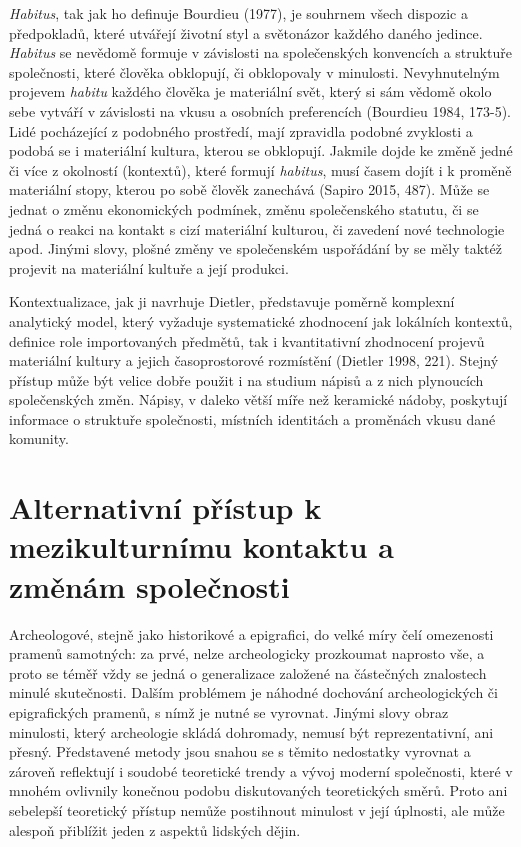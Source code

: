 {\em Habitus}, tak jak ho definuje Bourdieu (1977), je souhrnem všech dispozic a předpokladů, které utvářejí životní styl a světonázor každého daného jedince. {\em Habitus} se nevědomě formuje v závislosti na společenských konvencích a struktuře společnosti, které člověka obklopují, či obklopovaly v minulosti. Nevyhnutelným projevem {\em habitu} každého člověka je materiální svět, který si sám vědomě okolo sebe vytváří v závislosti na vkusu a osobních preferencích (Bourdieu 1984, 173-5). Lidé pocházející z podobného prostředí, mají zpravidla podobné zvyklosti a podobá se i materiální kultura, kterou se obklopují. Jakmile dojde ke změně jedné či více z okolností (kontextů), které formují {\em habitus}, musí časem dojít i k proměně materiální stopy, kterou po sobě člověk zanechává (Sapiro 2015, 487). Může se jednat o změnu ekonomických podmínek, změnu společenského statutu, či se jedná o reakci na kontakt s cizí materiální kulturou, či zavedení nové technologie apod. Jinými slovy, plošné změny ve společenském uspořádání by se měly taktéž projevit na materiální kultuře a její produkci.

Kontextualizace, jak ji navrhuje Dietler, představuje poměrně komplexní analytický model, který vyžaduje systematické zhodnocení jak lokálních kontextů, definice role importovaných předmětů, tak i kvantitativní zhodnocení projevů materiální kultury a jejich časoprostorové rozmístění (Dietler 1998, 221). Stejný přístup může být velice dobře použit i na studium nápisů a z nich plynoucích společenských změn. Nápisy, v daleko větší míře než keramické nádoby, poskytují informace o struktuře společnosti, místních identitách a proměnách vkusu dané komunity.

\section[alternativní-přístup-k-mezikulturnímu-kontaktu-a-změnám-společnosti]{Alternativní přístup k mezikulturnímu kontaktu a změnám společnosti}

Archeologové, stejně jako historikové a epigrafici, do velké míry čelí omezenosti pramenů samotných: za prvé, nelze archeologicky prozkoumat naprosto vše, a proto se téměř vždy se jedná o generalizace založené na částečných znalostech minulé skutečnosti. Dalším problémem je náhodné dochování archeologických či epigrafických pramenů, s nímž je nutné se vyrovnat. Jinými slovy obraz minulosti, který archeologie skládá dohromady, nemusí být reprezentativní, ani přesný. Představené metody jsou snahou se s těmito nedostatky vyrovnat a zároveň reflektují i soudobé teoretické trendy a vývoj moderní společnosti, které v mnohém ovlivnily konečnou podobu diskutovaných teoretických směrů. Proto ani sebelepší teoretický přístup nemůže postihnout minulost v její úplnosti, ale může alespoň přiblížit jeden z aspektů lidských dějin.

